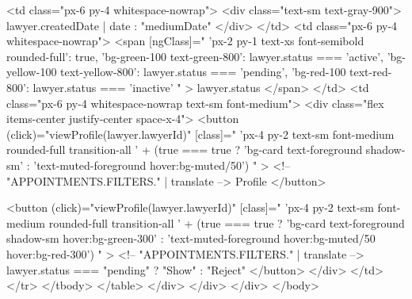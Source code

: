                 <td class="px-6 py-4 whitespace-nowrap">
                  <div class="text-sm text-gray-900">
                    {{ lawyer.createdDate | date : "mediumDate" }}
                  </div>
                </td>
                <td class="px-6 py-4 whitespace-nowrap">
                  <span
                    [ngClass]="{
                      'px-2 py-1 text-xs font-semibold rounded-full': true,
                      'bg-green-100 text-green-800': lawyer.status === 'active',
                      'bg-yellow-100 text-yellow-800':
                        lawyer.status === 'pending',
                      'bg-red-100 text-red-800': lawyer.status === 'inactive'
                    }"
                  >
                    {{ lawyer.status }}
                  </span>
                </td>
                <td class="px-6 py-4 whitespace-nowrap text-sm font-medium">
                  <div class="flex items-center justify-center space-x-4">
                    <button
                      (click)="viewProfile(lawyer.lawyerId)"
                      [class]="
                        'px-4 py-2 text-sm font-medium rounded-full transition-all ' +
                        (true === true
                          ? 'bg-card text-foreground shadow-sm'
                          : 'text-muted-foreground hover:bg-muted/50')
                      "
                    >
                      <!-- {{ "APPOINTMENTS.FILTERS." | translate }} -->
                      Profile
                    </button>

                    <button
                      (click)="viewProfile(lawyer.lawyerId)"
                      [class]="
                        'px-4 py-2 text-sm font-medium rounded-full transition-all ' +
                        (true === true
                          ? 'bg-card text-foreground shadow-sm hover:bg-green-300'
                          : 'text-muted-foreground hover:bg-muted/50 hover:bg-red-300')
                      "
                    >
                      <!-- {{ "APPOINTMENTS.FILTERS." | translate }} -->
                      {{ lawyer.status === "pending" ? "Show" : "Reject" }}
                    </button>
                  </div>
                </td>
              </tr>
            </tbody>
          </table>
        </div>
      </div>
    </div>
  </body>


